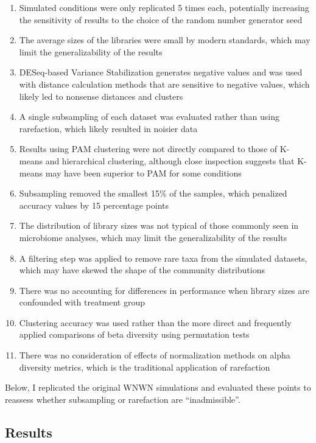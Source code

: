 \documentclass[
]{article}
\providecommand{\tightlist}{%
  \setlength{\itemsep}{0pt}\setlength{\parskip}{0pt}}
\begin{document}
\begin{enumerate}
\def\labelenumi{\arabic{enumi}.}
\tightlist
\item
  Simulated conditions were only replicated 5 times each, potentially
  increasing the sensitivity of results to the choice of the random
  number generator seed
\item
  The average sizes of the libraries were small by modern standards,
  which may limit the generalizability of the results
\item
  DESeq-based Variance Stabilization generates negative values and was
  used with distance calculation methods that are sensitive to negative
  values, which likely led to nonsense distances and clusters
\item
  A single subsampling of each dataset was evaluated rather than using
  rarefaction, which likely resulted in noisier data
\item
  Results using PAM clustering were not directly compared to those of
  K-means and hierarchical clustering, although close inspection
  suggests that K-means may have been superior to PAM for some
  conditions
\item
  Subsampling removed the smallest 15\% of the samples, which penalized
  accuracy values by 15 percentage points
\item
  The distribution of library sizes was not typical of those commonly
  seen in microbiome analyses, which may limit the generalizability of
  the results
\item
  A filtering step was applied to remove rare taxa from the simulated
  datasets, which may have skewed the shape of the community
  distributions
\item
  There was no accounting for differences in performance when library
  sizes are confounded with treatment group
\item
  Clustering accuracy was used rather than the more direct and
  frequently applied comparisons of beta diversity using permutation
  tests
\item
  There was no consideration of effects of normalization methods on
  alpha diversity metrics, which is the traditional application of
  rarefaction
\end{enumerate}

Below, I replicated the original WNWN simulations and evaluated these
points to reassess whether subsampling or rarefaction are
``inadmissible''.

\hypertarget{results}{%
\subsection{Results}\label{results}}
\end{document}
